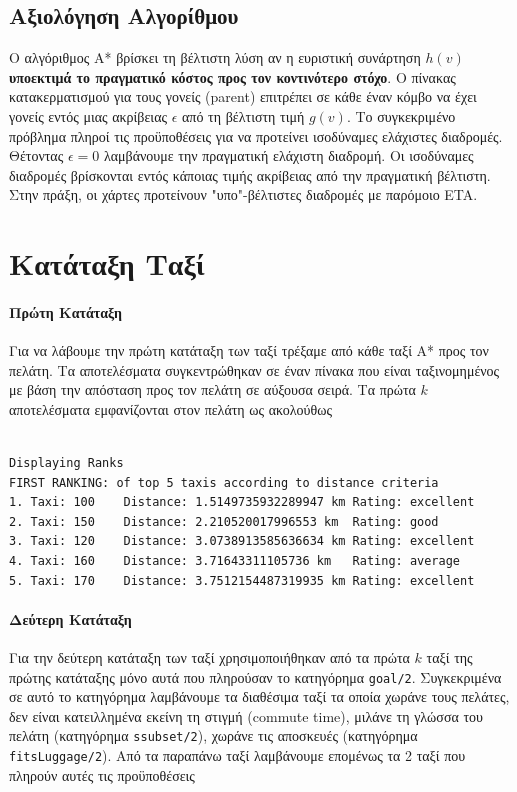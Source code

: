 \documentclass[a4paper,12pt]{article}
\begin{document}
\subsection{Αξιολόγηση Αλγορίθμου} 

Ο αλγόριθμος Α* βρίσκει τη βέλτιστη λύση αν η ευριστική συνάρτηση $h(v)$ \textbf{υποεκτιμά το πραγματικό κόστος προς τον κοντινότερο στόχο}. Ο πίνακας κατακερματισμού για τους γονείς (parent) επιτρέπει σε κάθε έναν κόμβο να έχει γονείς εντός μιας ακρίβειας $\epsilon$ από τη βέλτιστη τιμή $g(v)$. Το συγκεκριμένο πρόβλημα πληροί τις προϋποθέσεις για να προτείνει ισοδύναμες ελάχιστες διαδρομές. Θέτοντας $\epsilon = 0$ λαμβάνουμε την πραγματική ελάχιστη διαδρομή. Οι ισοδύναμες διαδρομές βρίσκονται εντός κάποιας τιμής ακρίβειας από την πραγματική βέλτιστη. Στην πράξη, οι χάρτες προτείνουν "υπο"-βέλτιστες διαδρομές με παρόμοιο ETA. 

\section{Κατάταξη Ταξί} 

\paragraph{Πρώτη Κατάταξη} Για να λάβουμε την πρώτη κατάταξη των ταξί τρέξαμε από κάθε ταξί Α* προς τον πελάτη. Τα αποτελέσματα συγκεντρώθηκαν σε έναν πίνακα που είναι ταξινομημένος με βάση την απόσταση προς τον πελάτη σε αύξουσα σειρά. Τα πρώτα $k$ αποτελέσματα εμφανίζονται στον πελάτη ως ακολούθως

\begin{lstlisting}

Displaying Ranks
FIRST RANKING: of top 5 taxis according to distance criteria
1. Taxi: 100	Distance: 1.5149735932289947 km	Rating: excellent
2. Taxi: 150	Distance: 2.210520017996553 km	Rating: good
3. Taxi: 120	Distance: 3.0738913585636634 km	Rating: excellent
4. Taxi: 160	Distance: 3.71643311105736 km	Rating: average
5. Taxi: 170	Distance: 3.7512154487319935 km	Rating: excellent

\end{lstlisting}

\paragraph{Δεύτερη Κατάταξη} Για την δεύτερη κατάταξη των ταξί χρησιμοποιήθηκαν από τα πρώτα $k$  ταξί της πρώτης κατάταξης μόνο αυτά που πληρούσαν το κατηγόρημα \texttt{goal/2}. Συγκεκριμένα σε αυτό το κατηγόρημα λαμβάνουμε τα διαθέσιμα ταξί τα οποία χωράνε τους πελάτες, δεν είναι κατειλλημένα εκείνη τη στιγμή (commute time), μιλάνε τη γλώσσα του πελάτη (κατηγόρημα \texttt{ssubset/2}), χωράνε τις αποσκευές (κατηγόρημα \texttt{fitsLuggage/2}). Από τα παραπάνω ταξί λαμβάνουμε επομένως τα 2 ταξί που πληρούν αυτές τις προϋποθέσεις
\end{document}
